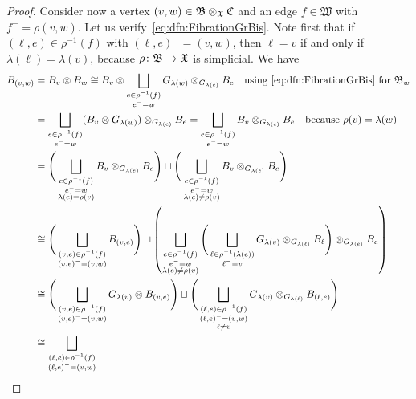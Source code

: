 \documentclass{amsart}
\begin{document}
\begin{proof}
  Consider now a vertex $(v,w)\in \mathfrak B\otimes_{\mathfrak X}\mathfrak C$
  and an edge $f\in \mathfrak W$ with $f^-=\rho(v,w)$. Let us
  verify~\eqref{eq:dfn:FibrationGrBis}. Note first that if $(\ell, e)\in \rho^{-1}(f)$ with $(\ell,e)^-=(v,w)$, then $\ell= v$ if and only if $\lambda(\ell)= \lambda(v)$, because $\rho\colon \mathfrak B\to {\mathfrak X} $ is simplicial.
  We have
  \begin{align*}
    B_{(v,w)} &= B_v\otimes B_w \cong  B_v  \otimes \bigsqcup_{\substack{e\in \rho^{-1}(f)\\ e^-=w}} G_{\lambda(w)}
    \otimes_{G_{\lambda(e)}} B_e \quad\text{using }\eqref{eq:dfn:FibrationGrBis}\text{ for }\mathfrak B_w\\
    &= \bigsqcup_{\substack{e\in \rho^{-1}(f)\\ e^-=w}} (B_v\otimes G_{\lambda(w)})
    \otimes_{G_{\lambda(e)}} B_e =  \bigsqcup_{\substack{e\in \rho^{-1}(f)\\ e^-=w}}B_v  
    \otimes_{G_{\lambda(e)}} B_e \quad\text{because }\rho(v)=\lambda(w) \\
    &= \Bigg(\bigsqcup_{\substack{e\in \rho^{-1}(f)\\ e^-=w\\ \lambda(e)=\rho(v)}} B_v
    \otimes_{G_{\lambda(e)}} B_e  \Bigg) \sqcup
    \Bigg(\bigsqcup_{\substack{e\in \rho^{-1}(f)\\ e^-=w\\ \lambda(e)\not =\rho(v)}} B_v
    \otimes_{G_{\lambda(e)}} B_e  \Bigg)\\
    &\cong \Bigg(\bigsqcup_{\substack{(v,e)\in \rho^{-1}(f)\\ (v,e)^-=(v,w)}} B_{(v,e)}  \Bigg)\sqcup\left(\bigsqcup_{\substack{e\in \rho^{-1}(f)\\ e^-=w\\ \lambda(e)\not =\rho(v)}}\Bigg(\bigsqcup_{\substack{\ell\in \rho^{-1}(\lambda(e))\\ \ell^-=v}} G_{\lambda(v)}\otimes_{G_{\lambda(\ell)}} B_\ell \Bigg) \otimes_{G_{\lambda(e)}} B_e\right) \\
    &\cong \Bigg(\bigsqcup_{\substack{(v,e)\in \rho^{-1}(f)\\ (v,e)^-=(v,w)}} G_{\lambda(v)}\otimes B_{(v,e)}\Bigg) \sqcup\Bigg(\bigsqcup_{\substack{(\ell,e)\in \rho^{-1}(f)\\ (\ell,e)^-=(v,w)\\ \ell\not =v}}
    G_{\lambda(v)}\otimes_{G_{\lambda(\ell)}} B_{(\ell, e)}  \Bigg)\\
    &\cong \bigsqcup_{\substack{(\ell,e)\in \rho^{-1}(f)\\ (\ell,e)^-=(v,w)}}

\end{align*}
\end{proof}
\end{document}
